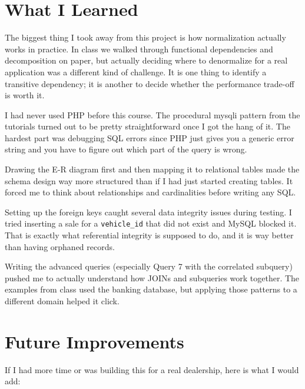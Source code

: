 \documentclass[12pt]{article}
\begin{document}
\section{What I Learned}

The biggest thing I took away from this project is how normalization actually works in practice. In class we walked through functional dependencies and decomposition on paper, but actually deciding where to denormalize for a real application was a different kind of challenge. It is one thing to identify a transitive dependency; it is another to decide whether the performance trade-off is worth it.

I had never used PHP before this course. The procedural mysqli pattern from the tutorials turned out to be pretty straightforward once I got the hang of it. The hardest part was debugging SQL errors since PHP just gives you a generic error string and you have to figure out which part of the query is wrong.

Drawing the E-R diagram first and then mapping it to relational tables made the schema design way more structured than if I had just started creating tables. It forced me to think about relationships and cardinalities before writing any SQL.

Setting up the foreign keys caught several data integrity issues during testing. I tried inserting a sale for a \texttt{vehicle\_id} that did not exist and MySQL blocked it. That is exactly what referential integrity is supposed to do, and it is way better than having orphaned records.

Writing the advanced queries (especially Query 7 with the correlated subquery) pushed me to actually understand how JOINs and subqueries work together. The examples from class used the banking database, but applying those patterns to a different domain helped it click.

\section{Future Improvements}

If I had more time or was building this for a real dealership, here is what I would add:
\end{document}
